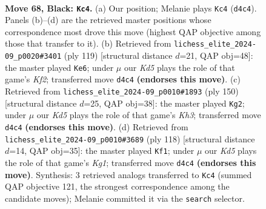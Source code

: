 \documentclass[11pt]{article}
\begin{document}
\clearpage

\begin{figure}[p]\centering
\begin{subfigure}{0.46\textwidth}\centering
\resizebox{\linewidth}{!}{%
\newchessgame
\chessboard[
  setfen={8/8/3Q2P1/4P2P/1r1k4/8/2K5/8 b - - 4 68},
  showmover=false,
  pgfstyle=straightmove, color=movearrow, markmove={d4-c4}
]}
\caption{}
\end{subfigure}\hfill
\begin{subfigure}{0.46\textwidth}\centering
\resizebox{\linewidth}{!}{%
\newchessgame
\chessboard[
  setfen={8/p1Q2k2/3P1r2/8/6K1/8/P5P1/8 b - - 5 60},
  showmover=false,
  pgfstyle=straightmove, color=movearrow, markmove={f7-e6}
]}
\caption{}
\end{subfigure}
\\[4pt]
\begin{subfigure}{0.46\textwidth}\centering
\resizebox{\linewidth}{!}{%
\newchessgame
\chessboard[
  setfen={8/8/8/6pk/7q/6RK/8/8 w - - 17 76},
  showmover=false,
  pgfstyle=straightmove, color=movearrow, markmove={h3-g2}
]}
\caption{}
\end{subfigure}\hfill
\begin{subfigure}{0.46\textwidth}\centering
\resizebox{\linewidth}{!}{%
\newchessgame
\chessboard[
  setfen={8/6k1/8/7p/8/6p1/6Pq/1R4K1 w - - 6 60},
  showmover=false,
  pgfstyle=straightmove, color=movearrow, markmove={g1-f1}
]}
\caption{}
\end{subfigure}
\caption{\textbf{Move 68, Black: \texttt{Kc4}.} (a) Our position; Melanie plays \texttt{Kc4} (\texttt{d4c4}). Panels (b)--(d) are the retrieved master positions whose correspondence most drove this move (highest QAP objective among those that transfer to it). (b) Retrieved from \texttt{lichess\_elite\_2024-09\_p0020\#3401} (ply 119) [structural distance $d$=21, QAP obj=48]: the master played \texttt{Ke6}; under $\mu$ our \emph{Kd5} plays the role of that game's \emph{Kf2}; transferred move \texttt{d4c4} \textbf{(endorses this move)}. (c) Retrieved from \texttt{lichess\_elite\_2024-09\_p0010\#1893} (ply 150) [structural distance $d$=25, QAP obj=38]: the master played \texttt{Kg2}; under $\mu$ our \emph{Kd5} plays the role of that game's \emph{Kh3}; transferred move \texttt{d4c4} \textbf{(endorses this move)}. (d) Retrieved from \texttt{lichess\_elite\_2024-09\_p0010\#3689} (ply 118) [structural distance $d$=14, QAP obj=35]: the master played \texttt{Kf1}; under $\mu$ our \emph{Kd5} plays the role of that game's \emph{Kg1}; transferred move \texttt{d4c4} \textbf{(endorses this move)}. Synthesis: 3 retrieved analogs transferred to \texttt{Kc4} (summed QAP objective 121, the strongest correspondence among the candidate moves); Melanie committed it via the \texttt{search} selector.}
\label{fig:thought-m135}
\end{figure}
\end{document}
